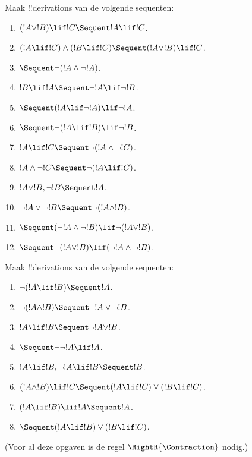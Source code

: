 \documentclass[openany]{memoir}
\begin{document}
\begin{prob}
Maak !!{derivation}s van de volgende sequenten:
\begin{enumerate}
\item $(!A \lor !B) \lif !C \Sequent !A \lif !C$.
\item $(!A \lif !C) \land (!B \lif !C) \Sequent (!A \lor !B) \lif !C$.
\item $\Sequent \lnot(!A \land \lnot !A)$.
\item $!B \lif !A \Sequent \lnot !A \lif \lnot !B$.
\item $\Sequent (!A \lif \lnot !A) \lif \lnot !A$.
\item $\Sequent \lnot(!A \lif !B) \lif \lnot !B$.
\item $!A \lif !C \Sequent \lnot (!A \land \lnot !C)$.
\item $!A \land \lnot !C \Sequent \lnot (!A \lif !C)$.
\item $!A \lor !B, \lnot !B \Sequent !A$.
\item $\lnot !A \lor \lnot !B \Sequent \lnot(!A \land !B)$.
\item $\Sequent (\lnot !A \land \lnot !B) \lif\lnot(!A \lor !B)$.
\item $\Sequent \lnot(!A \lor !B) \lif (\lnot !A \land \lnot !B)$.
\end{enumerate}
\end{prob}

\begin{prob}
Maak !!{derivation}s van de volgende sequenten:
\begin{enumerate}
\item $\lnot(!A \lif !B) \Sequent !A$.
\item $\lnot(!A \land !B) \Sequent \lnot !A \lor \lnot !B$.
\item $!A \lif !B \Sequent \lnot !A \lor !B$.
\item $\Sequent \lnot \lnot !A \lif !A$.
\item $!A \lif !B, \lnot !A \lif !B \Sequent !B$.
\item $(!A \land !B) \lif !C \Sequent (!A \lif !C) \lor (!B \lif !C)$.
\item $(!A \lif !B) \lif !A \Sequent !A$.
\item $\Sequent (!A \lif !B) \lor (!B \lif !C)$.
\end{enumerate}
(Voor al deze opgaven is de regel $\RightR{\Contraction}$ nodig.)
\end{prob}
\endgroup
\end{document}
